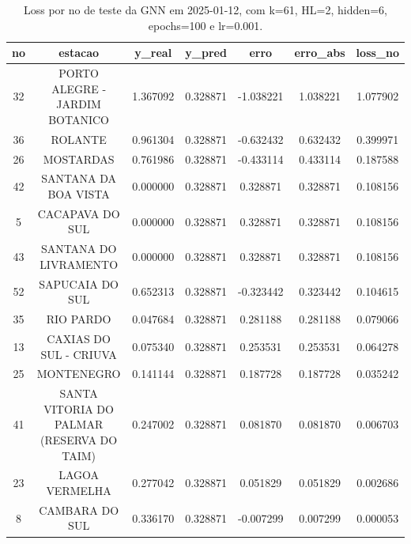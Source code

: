 \begin{table}[h]
\centering
\caption{Loss por no de teste da GNN em 2025-01-12, com k=61, HL=2, hidden=6, epochs=100 e lr=0.001.}
\label{tab:gnn_loss_k61_hl2_h6_e100_d20250112}
\begin{tabular}{ccccccc}
\toprule
no & estacao & y\_real & y\_pred & erro & erro\_abs & loss\_no \\
\midrule
32 & PORTO ALEGRE - JARDIM BOTANICO & 1.367092 & 0.328871 & -1.038221 & 1.038221 & 1.077902 \\
36 & ROLANTE & 0.961304 & 0.328871 & -0.632432 & 0.632432 & 0.399971 \\
26 & MOSTARDAS & 0.761986 & 0.328871 & -0.433114 & 0.433114 & 0.187588 \\
42 & SANTANA DA BOA VISTA & 0.000000 & 0.328871 & 0.328871 & 0.328871 & 0.108156 \\
5 & CACAPAVA DO SUL & 0.000000 & 0.328871 & 0.328871 & 0.328871 & 0.108156 \\
43 & SANTANA DO LIVRAMENTO & 0.000000 & 0.328871 & 0.328871 & 0.328871 & 0.108156 \\
52 & SAPUCAIA DO SUL & 0.652313 & 0.328871 & -0.323442 & 0.323442 & 0.104615 \\
35 & RIO PARDO & 0.047684 & 0.328871 & 0.281188 & 0.281188 & 0.079066 \\
13 & CAXIAS DO SUL - CRIUVA & 0.075340 & 0.328871 & 0.253531 & 0.253531 & 0.064278 \\
25 & MONTENEGRO & 0.141144 & 0.328871 & 0.187728 & 0.187728 & 0.035242 \\
41 & SANTA VITORIA DO PALMAR (RESERVA DO TAIM) & 0.247002 & 0.328871 & 0.081870 & 0.081870 & 0.006703 \\
23 & LAGOA VERMELHA & 0.277042 & 0.328871 & 0.051829 & 0.051829 & 0.002686 \\
8 & CAMBARA DO SUL & 0.336170 & 0.328871 & -0.007299 & 0.007299 & 0.000053 \\
\bottomrule
\end{tabular}
\end{table}
